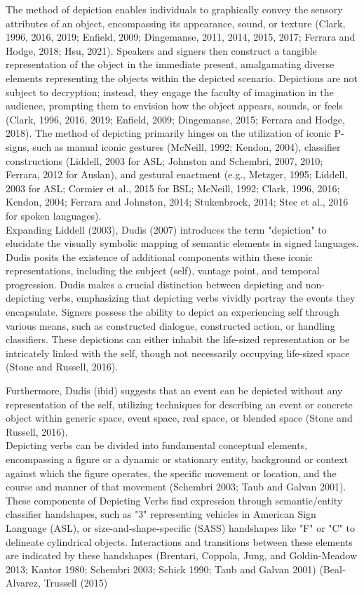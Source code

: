 The method of depiction enables individuals to graphically convey the sensory attributes of an object, encompassing its appearance, sound, or texture (Clark, 1996, 2016, 2019; Enfield, 2009; Dingemanse, 2011, 2014, 2015, 2017; Ferrara and Hodge, 2018; Hsu, 2021). Speakers and signers then construct a tangible representation of the object in the immediate present, amalgamating diverse elements representing the objects within the depicted scenario. Depictions are not subject to decryption; instead, they engage the faculty of imagination in the audience, prompting them to envision how the object appears, sounds, or feels (Clark, 1996, 2016, 2019; Enfield, 2009; Dingemanse, 2015; Ferrara and Hodge, 2018). The method of depicting primarily hinges on the utilization of iconic P-signs, such as manual iconic gestures (McNeill, 1992; Kendon, 2004), classifier constructions (Liddell, 2003 for ASL; Johnston and Schembri, 2007, 2010; Ferrara, 2012 for Auslan), and gestural enactment (e.g., Metzger, 1995; Liddell, 2003 for ASL; Cormier et al., 2015 for BSL; McNeill, 1992; Clark, 1996, 2016; Kendon, 2004; Ferrara and Johnston, 2014; Stukenbrock, 2014; Stec et al., 2016 for spoken languages).\\

Expanding Liddell (2003), Dudis (2007) introduces the term "depiction" to elucidate the visually symbolic mapping of semantic elements in signed languages. Dudis posits the existence of additional components within these iconic representations, including the subject (self), vantage point, and temporal progression. Dudis makes a crucial distinction between depicting and non-depicting verbs, emphasizing that depicting verbs vividly portray the events they encapsulate. Signers possess the ability to depict an experiencing self through various means, such as constructed dialogue, constructed action, or handling classifiers. These depictions can either inhabit the life-sized representation or be intricately linked with the self, though not necessarily occupying life-sized space (Stone and Russell, 2016).

Furthermore, Dudis (ibid)  suggests that an event can be depicted without any representation of the self, utilizing techniques for describing an event or concrete object within generic space, event space, real space, or blended space (Stone and Russell, 2016). \\

Depicting verbs can be divided into fundamental conceptual elements, encompassing a figure or a dynamic or stationary entity, background or context against which the figure operates, the specific movement or location, and the course and manner of that movement (Schembri 2003; Taub and Galvan 2001). These components of Depicting Verbs find expression through semantic/entity classifier handshapes, such as "3" representing vehicles in American Sign Language (ASL), or size-and-shape-specific (SASS) handshapes like "F" or "C" to delineate cylindrical objects. Interactions and transitions between these elements are indicated by these handshapes (Brentari, Coppola, Jung, and Goldin-Meadow 2013; Kantor 1980; Schembri 2003; Schick 1990; Taub and Galvan 2001) (Beal-Alvarez, Trussell (2015) \\


